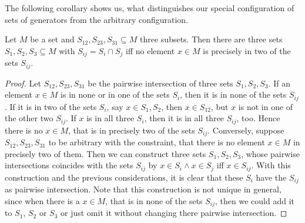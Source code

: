The following corollary shows us, what distinguishes our special configuration of sets of generators from the arbitrary configuration.

\begin{coro}
	Let $M$ be a set and $S_{12},S_{23},S_{31} \subseteq M$ three subsets. Then there are three sets $S_1,S_2,S_3 \subseteq M$ with $S_{ij} = S_i \cap S_j$ iff no element $x \in M$ is precisely in two of the sets $S_{ij}$.

	\begin{proof}
		Let $S_{12},S_{23},S_{31}$ be the pairwise intersection of three sets $S_1,S_2,S_3$. If an element $x \in M$ is in none or in one of the sets $S_i$, then it is in none of the sets $S_{ij}$. If it is in two of the sets $S_i$, say $x \in S_1,S_2$, then $x \in S_{12}$, but $x$ is not in one of the other two $S_{ij}$. If $x$ is in all three $S_i$, then it is in all three $S_{ij}$, too. Hence there is no $x \in M$, that is in precisely two of the sets $S_{ij}$. Conversely, suppose $S_{12},S_{23},S_{31}$ to be arbitrary with the constraint, that there is no element $x \in M$ in precisely two of them. Then we can construct three sets $S_1,S_2,S_3$, whose pairwise intersections coincides with the sets $S_{ij}$ by $x \in S_i \wedge x \in S_j$ iff $x \in S_{ij}$. With this construction and the previous considerations, it is clear that these $S_i$ have the $S_{ij}$ as pairwise intersection. Note that this construction is not unique in general, since when there is a $x \in M$, that is in none of the sets $S_{ij}$, then we could add it to $S_1$, $S_2$ or $S_3$ or just omit it without changing there pairwise intersection.
	\end{proof}
\end{coro}



